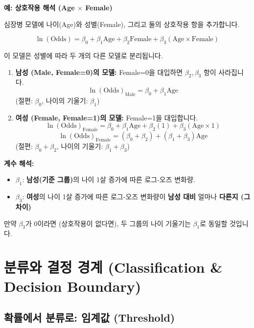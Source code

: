 \documentclass[11pt,a4paper]{book}
\theoremstyle{definition}
\begin{document}
\begin{examplebox}
  \textbf{예: 상호작용 해석 (Age $\times$ Female)}

  심장병 모델에 나이(Age)와 성별(Female), 그리고 둘의 상호작용 항을 추가합니다.

  $$ \ln(\text{Odds}) = \beta_0 + \beta_1 \text{Age} + \beta_2 \text{Female} + \beta_3 (\text{Age} \times \text{Female}) $$

  이 모델은 성별에 따라 두 개의 다른 모델로 분리됩니다.

  \begin{enumerate}
    \item \textbf{남성 (Male, Female=0)의 모델:}
        Female=0을 대입하면 $\beta_2, \beta_3$ 항이 사라집니다.
        $$ \ln(\text{Odds})_{\text{Male}} = \beta_0 + \beta_1 \text{Age} $$
        (절편: $\beta_0$, 나이의 기울기: $\beta_1$)

    \item \textbf{여성 (Female, Female=1)의 모델:}
        Female=1을 대입합니다.
        $$ \ln(\text{Odds})_{\text{Female}} = \beta_0 + \beta_1 \text{Age} + \beta_2(1) + \beta_3 (\text{Age} \times 1) $$
        $$ \ln(\text{Odds})_{\text{Female}} = (\beta_0 + \beta_2) + (\beta_1 + \beta_3) \text{Age} $$
        (절편: $\beta_0 + \beta_2$, 나이의 기울기: $\beta_1 + \beta_3$)
  \end{enumerate}

  \textbf{계수 해석:}
  \begin{itemize}
    \item $\beta_1$: \textbf{남성(기준 그룹)}의 나이 1살 증가에 따른 로그-오즈 변화량.
    \item $\beta_3$: \textbf{여성}의 나이 1살 증가에 따른 로그-오즈 변화량이 \textbf{남성 대비} 얼마나 \textbf{다른지 (그 차이)}
  \end{itemize}
  만약 $\beta_3$가 0이라면 (상호작용이 없다면), 두 그룹의 나이 기울기는 $\beta_1$로 동일할 것입니다.
\end{examplebox}


\section{분류와 결정 경계 (Classification \& Decision Boundary)}

\subsection{확률에서 분류로: 임계값 (Threshold)}
\end{document}
